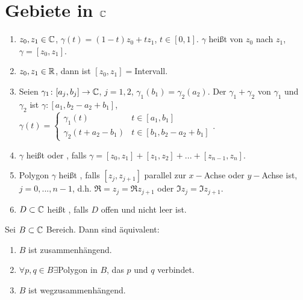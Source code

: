 \section*{Gebiete in $ \mathbb{C} $}
\begin{definition}
	\bullshit
	\begin{enumerate}
		\item $ z_0,z_1\in\mathbb{C} $, $ \gamma(t)=(1-t)z_0+tz_1 $, $ t\in[0,1] $. $ \gamma $ hei\ss t  von $ z_0 $ nach $ z_1 $, $ \gamma=[z_0,z_1] $.
		\item $ z_0,z_1\in\mathbb{R} $, dann ist $ [z_0,z_1]= $Intervall.
		\item Seien $ \gamma_1\colon[a_j,b_j]\rightarrow\mathbb{C} $, $ j=1,2 $, $ \gamma_1(b_1)=\gamma_2(a_2) $. Der  $ \gamma_1+\gamma_2 $ von $ \gamma_1 $ und $ \gamma_2 $ ist $ \gamma\colon[a_1,b_2-a_2+b_1] $, $ \gamma(t)=\begin{cases}
		\gamma_1(t)&t\in[a_1,b_1]\\\gamma_2(t+a_2-b_1)&t\in[b_1,b_2-a_2+b_1]
		\end{cases} $.
		\item $ \gamma $ hei\ss t  oder , falls $ \gamma=[z_0,z_1]+[z_1,z_2]+...+[z_{n-1},z_n] $.
		\item Polygon $ \gamma $ hei\ss t , falls $ [z_j,z_{j+1}] $ parallel zur $ x- $Achse oder $ y- $Achse ist, $ j=0,...,n-1 $, d.h. $ \Re=z_j=\Re z_{j+1} $ oder $ \Im z_j=\Im z_{j+1} $.
		\item $ D\subset\mathbb{C} $ hei\ss t , falls $ D $ offen und nicht leer ist.
	\end{enumerate}
\end{definition}
\begin{satz}
	Sei $ B\subset\mathbb{C} $ Bereich. Dann sind \"aquivalent:
	\begin{enumerate}
		\item $ B $ ist zusammenh\"angend.
		\item $ \forall p,q\in B\exists $Polygon in $ B $, das $ p $ und $ q $ verbindet.
		\item $ B $ ist wegzusammenh\"angend.
	\end{enumerate}
\end{satz}

